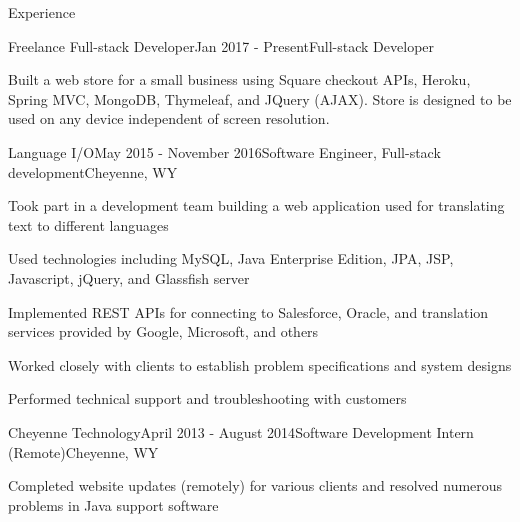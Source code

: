 \documentclass{resume} %
\begin{document}
\begin{rSection}{Experience}
	
		
	\begin{rSubEmploymentSection}{Freelance Full-stack Developer}{Jan 2017 - Present}{Full-stack Developer}
		\item Built a web store for a small business using Square checkout APIs, Heroku, Spring MVC, MongoDB, Thymeleaf, and JQuery (AJAX). Store is designed to be used on any device independent of screen resolution.
	\end{rSubEmploymentSection}	
		
	\begin{rSubEmploymentSection}{Language I/O}{May 2015 - November 2016}{Software Engineer, Full-stack development}{Cheyenne, WY}
	\item Took part in a development team building a web application used for translating text to different languages
	\item Used technologies including MySQL, Java Enterprise Edition, JPA, JSP, Javascript, jQuery, and Glassfish server
	\item Implemented REST APIs for connecting to Salesforce, Oracle, and translation services provided by Google, Microsoft, and others
	\item Worked closely with clients to establish problem specifications and system designs
	\item Performed technical support and troubleshooting with customers
	\end{rSubEmploymentSection}
	
	\begin{rSubEmploymentSection}{Cheyenne Technology}{April 2013 - August 2014}{Software Development Intern (Remote)}{Cheyenne, WY}
	\item Completed website updates (remotely) for various clients and resolved numerous problems in Java support software
	\end{rSubEmploymentSection}
	

\end{rSection}
\end{document}
